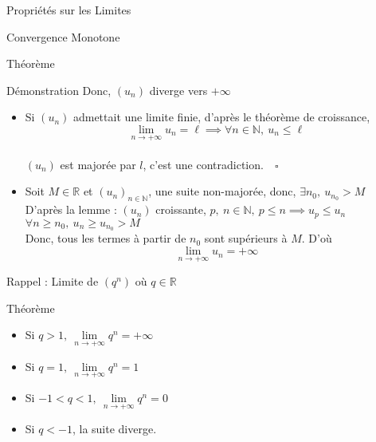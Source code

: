 \documentclass{cours}
\begin{document}
\begin{Gpartie}{Propriétés sur les Limites}
\begin{Spartie}{Convergence Monotone}
\begin{SSpartie}{Théorème}
\begin{SSSpartie}{Démonstration}
                    Donc, $(u_n)$ diverge vers $+\infty$
                    \begin{itemize}
                        \item Si $(u_n)$ admettait une limite finie, d'après le théorème de croissance, 
                        \[\lim\limits_{n\to +\infty}u_n=\ell\implies\forall n\in\mathbb{N},\ u_n\leq\ell\] \\ $(u_n)$ est majorée par $l$, c'est une contradiction.$\quad\square$
                        \\[2ex]
                        \item Soit $M\in\mathbb{R}$ et $(u_n)_{n\in\mathbb{N}}$, une suite non-majorée, donc, $\exists n_0,\ u_{n_0}>M$ \\ D'après la lemme : $(u_n)$ croissante, $p,\ n\in\mathbb{N},\ p\leq n\implies u_p\leq u_n$ \\ $\forall n\geq n_0,\ u_n\geq u_{n_0}>M$ \\ Donc, tous les termes à partir de $n_0$ sont supérieurs à $M$. D'où \[\lim\limits_{n\to +\infty}u_n=+\infty\]
                    \end{itemize}
                \end{SSSpartie}
            \end{SSpartie}
        \end{Spartie}
        \begin{Spartie}{Rappel : Limite de $\left(q^n\right)$ où $q\in\mathbb{R}$} 
            \begin{SSpartie}{Théorème} 
                \begin{itemize}
                    \setlength\itemsep{0.5em}
                    \item Si $q>1,~\lim\limits_{n\to+\infty}q^n=+\infty$
                    \item Si $q=1,~\lim\limits_{n\to+\infty}q^n=1$
                    \item Si $-1<q<1,~\lim\limits_{n\to+\infty}q^n=0$
                    \item Si $q<-1$, la suite diverge.
                \end{itemize}
            \end{SSpartie}
        \end{Spartie}
    \end{Gpartie}
    \pagebreak
\end{document}
